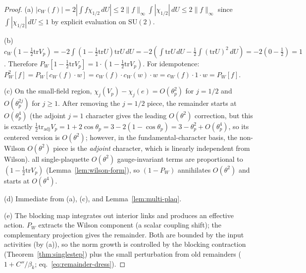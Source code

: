 \documentclass[11pt]{article}
\theoremstyle{definition}
\newcommand{\SU}{\mathrm{SU}}
\newcommand{\tr}{\mathrm{tr}}
\begin{document}
\begin{proof}
(a) $|c_W(f)|=2|\int f\chi_{1/2}\,dU|\le 2\|f\|_\infty
\int|\chi_{1/2}|\,dU\le 2\|f\|_\infty$ since
$\int|\chi_{1/2}|\,dU\le 1$ by explicit evaluation on $\SU(2)$.

(b) $c_W(1-\frac{1}{2}\tr V_p)
=-2\int(1-\frac{1}{2}\tr U)\tr U\,dU
=-2(\int\tr U\,dU-\frac{1}{2}\int(\tr U)^2\,dU)
=-2(0-\frac{1}{2})=1$.
Therefore $P_W[1-\frac{1}{2}\tr V_p]
=1\cdot(1-\frac{1}{2}\tr V_p)$.
For idempotence: $P_W^2[f]=P_W[c_W(f)\cdot w]
=c_W(f)\cdot c_W(w)\cdot w=c_W(f)\cdot 1\cdot w=P_W[f]$.

(c) On the small-field region, $\chi_j(V_p)-\chi_j(e)
=O(\theta_p^2)$ for $j=1/2$ and $O(\theta_p^{2j})$ for $j\ge 1$.
After removing the $j=1/2$ piece, the remainder starts at
$O(\theta_p^4)$ (the adjoint $j=1$ character gives the
leading $O(\theta^2)$ correction, but this is exactly
$\frac{1}{2}\tr_{\mathrm{adj}}V_p=
1+2\cos\theta_p=3-2(1-\cos\theta_p)=3-\theta_p^2+O(\theta_p^4)$,
so its centered version is $O(\theta^2)$; however, in the
fundamental-character basis, the non-Wilson $O(\theta^2)$
piece is the \emph{adjoint} character, which is linearly
independent from Wilson).  all
single-plaquette $O(\theta^2)$ gauge-invariant terms are
proportional to $(1-\frac{1}{2}\tr V_p)$
(Lemma~\ref{lem:wilson-form}), so $(1-P_W)$ annihilates
$O(\theta^2)$ and starts at $O(\theta^4)$.

(d) Immediate from (a), (c), and Lemma~\ref{lem:multi-plaq}.

(e) The blocking map integrates out interior links and produces
an effective action.  $P_W$ extracts the Wilson component (a
scalar coupling shift); the complementary projection gives the
remainder.  Both are bounded by the input activities
(by (a)), so the norm growth is controlled by the blocking
contraction (Theorem~\ref{thm:singlestep}) plus the small
perturbation from old remainders ($1+C''/\beta_k$;
eq.~\eqref{eq:remainder-dress}).
\end{proof}
\end{document}
